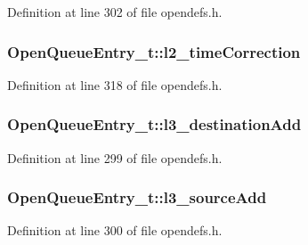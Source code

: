 Definition at line 302 of file opendefs.\+h.

\subsubsection[{\texorpdfstring{l2\+\_\+time\+Correction}{l2_timeCorrection}}]{ Open\+Queue\+Entry\+\_\+t\+::l2\+\_\+time\+Correction}\hypertarget{struct_open_queue_entry__t_aeaf976a926060ebbc87920ffde6dc5ed}{}\label{struct_open_queue_entry__t_aeaf976a926060ebbc87920ffde6dc5ed}


Definition at line 318 of file opendefs.\+h.

\subsubsection[{\texorpdfstring{l3\+\_\+destination\+Add}{l3_destinationAdd}}]{ Open\+Queue\+Entry\+\_\+t\+::l3\+\_\+destination\+Add}\hypertarget{struct_open_queue_entry__t_ae03d74d993e4af2003afb3a0a9bb8c74}{}\label{struct_open_queue_entry__t_ae03d74d993e4af2003afb3a0a9bb8c74}


Definition at line 299 of file opendefs.\+h.

\subsubsection[{\texorpdfstring{l3\+\_\+source\+Add}{l3_sourceAdd}}]{ Open\+Queue\+Entry\+\_\+t\+::l3\+\_\+source\+Add}\hypertarget{struct_open_queue_entry__t_a9644ca47e59b28449a3b7519a057263c}{}\label{struct_open_queue_entry__t_a9644ca47e59b28449a3b7519a057263c}


Definition at line 300 of file opendefs.\+h.

